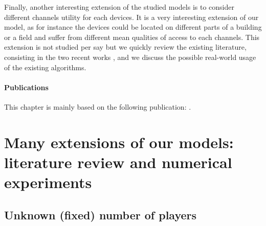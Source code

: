 Finally, another interesting extension of the studied models is to consider different channels utility for each devices. It is a very interesting extension of our model, as for instance the devices could be located on different parts of a building or a field and suffer from different mean qualities of access to each channels.
This extension is not studied per say but we quickly review the existing literature, consisting in the two recent works \cite{Bistritz18,KaufmannAbbas19}, and we discuss the possible real-world usage of the existing algorithms.




\vfill{}

\paragraph{Publications}

This chapter is mainly based on the following publication: \cite{Besson2018ALT}.


\newpage
\graphicspath{{2-Chapters/5-Chapter/Images/}}
\graphicspath{{2-Chapters/5-Chapter/ALT_2018__MPBandits.git/figures/}}




\section{Many extensions of our models: literature review and numerical experiments}
\label{sec:5:literatureReviewOtherModels}




\subsection{Unknown (fixed) number of players}
\label{sub:5:unknownNumberOfPlayers}



